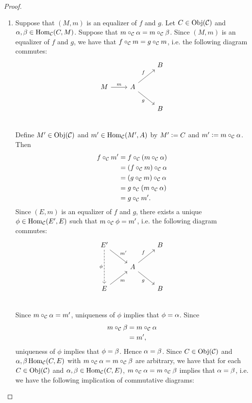 \documentclass{book}
\begin{document}
	\begin{proof}\
		\begin{enumerate}
			\item Suppose that $(M, m)$ is an equalizer of $f$ and $g$. Let $C \in \operatorname{Obj}(\mathcal{C})$ and $\alpha, \beta \in \operatorname{Hom}_{\mathcal{C}}(C, M)$. Suppose that $m \circ_{\mathcal{C}} \alpha = m \circ_{\mathcal{C}} \beta$. Since $(M, m)$ is an equalizer of $f$ and $g$, we have that $f \circ_{\mathcal{C}} m = g \circ_{\mathcal{C}} m$, i.e. the following diagram commutes: 
			\[ 
			\begin{tikzcd}[baseline= 7]
				&                                   & B \\
				M \arrow[r, "m"]  & A \arrow[ur, "f"] \arrow[dr, "g"'] &   \\
				&                                   & B \\
			\end{tikzcd}
			\]
			Define $M' \in \operatorname{Obj}(\mathcal{C})$ and $m' \in \operatorname{Hom}_{\mathcal{C}}(M', A)$ by $M' \vcentcolon= C$ and $m' \vcentcolon= m \circ_{\mathcal{C}} \alpha$. Then 
			\begin{align*}
				f \circ_{\mathcal{C}} m'
				& = f \circ_{\mathcal{C}} (m \circ_{\mathcal{C}} \alpha) \\
				& = (f \circ_{\mathcal{C}} m) \circ_{\mathcal{C}} \alpha \\
				& = (g \circ_{\mathcal{C}} m) \circ_{\mathcal{C}} \alpha \\
				& = g \circ_{\mathcal{C}} (m \circ_{\mathcal{C}} \alpha) \\
				& = g \circ_{\mathcal{C}} m'.
			\end{align*}
			Since $(E,m)$ is an equalizer of $f$ and $g$, there exists a unique $\phi \in \operatorname{Hom}_{\mathcal{C}}(E', E)$ such that $m \circ_{\mathcal{C}} \phi = m'$, i.e. the following diagram commutes:
			\[ 
			\begin{tikzcd}[baseline= 7]
				E' \arrow[dr, "m'"] \arrow[dd, "\phi"', dashed]&     & B \\
				& A \arrow[ur, "f"] \arrow[dr, "g"'] &   \\
				E \arrow[ur, "m"'] &                                  & B \\
			\end{tikzcd}
			\]
			Since $m \circ_{\mathcal{C}} \alpha = m'$, uniqueness of $\phi$ implies that $\phi = \alpha$. Since 
			\begin{align*}
				m \circ_{\mathcal{C}} \beta 
				& = m \circ_{\mathcal{C}} \alpha \\
				& = m',
			\end{align*}
			uniqueness of $\phi$ implies that $\phi = \beta$. Hence $\alpha = \beta$. Since $C \in \operatorname{Obj}(\mathcal{C})$ and $\alpha,\beta \operatorname{Hom}_{\mathcal{C}}(C,E)$ with $m \circ_{\mathcal{C}} \alpha = m \circ_{\mathcal{C}} \beta$ are arbitrary, we have that for each $C \in \operatorname{Obj}(\mathcal{C})$ and $\alpha, \beta \in \operatorname{Hom}_{\mathcal{C}}(C, E)$, $m \circ_{\mathcal{C}} \alpha = m \circ_{\mathcal{C}} \beta$ implies that $\alpha = \beta$, i.e. we have the following implication of commutative diagrams: 

\end{enumerate}
\end{proof}
\end{document}
